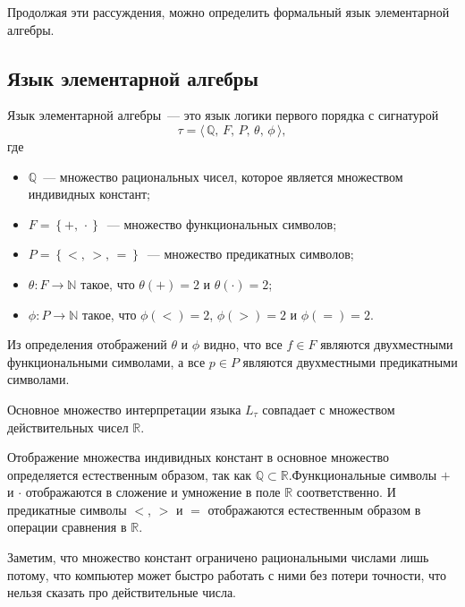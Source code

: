 Продолжая эти рассуждения, можно определить формальный язык элементарной алгебры.

\subsection{Язык элементарной алгебры}

Язык элементарной алгебры~--- это язык логики первого порядка с сигнатурой
\begin{equation*}
    \tau = \langle \, \mathbb{Q},\, F,\, P,\, \theta,\, \phi \, \rangle,
\end{equation*}
где
\begin{itemize}
	\item $\mathbb{Q}$~--- множество рациональных чисел, которое является множеством индивидных констант;
	\item $F =  \left\{+,\, \cdot\right\}$~--- множество функциональных символов;
	\item $P = \left\{ <,\, >,\, = \right\}$~--- множество предикатных символов;
	\item $\theta : F \rightarrow \mathbb{N}$ такое, что $\theta(+) = 2$ и $\theta(\cdot) = 2$;
	\item $\phi : P \rightarrow \mathbb{N}$ такое, что $\phi(<) = 2$, $\phi(>) = 2$ и $\phi(=) = 2$. 
\end{itemize}

Из определения отображений $\theta$ и $\phi$ видно, что все $f \in F$ являются двухместными функциональными символами, а все $p \in P$ являются двухместными предикатными символами.

Основное множество интерпретации языка $L_\tau $ совпадает с множеством действительных чисел $\mathbb{R}$.

Отображение множества индивидных констант в основное множество определяется естественным образом, так как $\mathbb{Q} \subset \mathbb{R}$.Функциональные символы $+$ и $\cdot$ отображаются в сложение и умножение в поле $\mathbb{R}$ соответственно. И предикатные символы $<$, $>$ и $=$ отображаются естественным образом в операции сравнения в $\mathbb{R}$.

Заметим, что множество констант ограничено рациональными числами лишь потому, что компьютер может быстро работать с ними без потери точности, что нельзя сказать про действительные числа.


